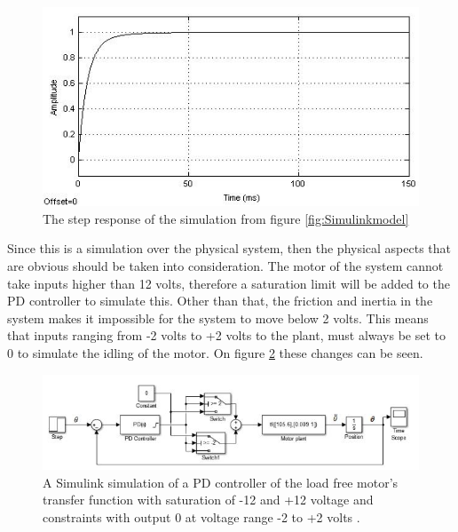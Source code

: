 \begin{figure}[h!]
\centering
\includegraphics[scale=0.7]{Billeder/SimuStepPDNoConstrains.jpg}
\caption{ The step response of the simulation from figure \ref{fig:Simulinkmodel} }
\label{fig:SimuStepPDNoConstrains}
\end{figure}

Since this is a simulation over the physical system, then the physical aspects that are obvious should be taken into consideration. The motor of the system cannot take inputs higher than 12 volts, therefore a saturation limit will be added to the PD controller to simulate this. Other than that, the friction and inertia in the system makes it impossible for the system to move below 2 volts. This means that inputs ranging from -2 volts to +2 volts to the plant, must always be set to 0 to simulate the idling of the motor. On figure \ref{fig:simulinkmodelwithconstrains} these changes can be seen.

\begin{figure}[h!]
\centering
\includegraphics[scale=0.7]{Billeder/simulinkmodelwithconstrains.jpg}
\caption{ A Simulink simulation of a PD controller of the load free motor’s transfer function with saturation of -12 and +12 voltage and constraints with output 0 at voltage range -2 to +2 volts . }
\label{fig:simulinkmodelwithconstrains}
\end{figure}

